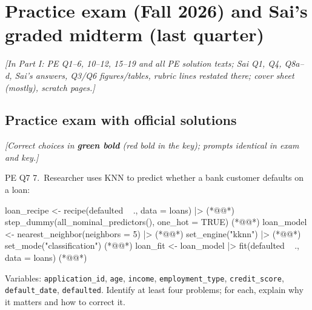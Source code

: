 \section{Practice exam (Fall 2026) and Sai's graded midterm (last quarter)}
{\color{figgray}\itshape [In Part I: PE Q1--6, 10--12, 15--19 and all PE solution texts; Sai Q1, Q4, Q8a--d, Sai's answers, Q3/Q6 figures/tables, rubric lines restated there; cover sheet (mostly), scratch pages.]}

\subsection{Practice exam with official solutions}
{\color{figgray}\itshape [Correct choices in {\color{keyc}\bfseries green bold} (red bold in the key); prompts identical in exam and key.]}

\begin{qbox}{PE Q7}
7.~Researcher uses KNN to predict whether a bank customer defaults on a loan:
\begin{rcode}
loan_recipe <-
  recipe(defaulted ~ ., data = loans) |>                    (*@\ixch{|>}@*)
  step_dummy(all_nominal_predictors(), one_hot = TRUE)      (*@@*)
loan_model <-
  nearest_neighbor(neighbors = 5) |>                        (*@@*)
  set_engine("kknn") |>                                     (*@@*)
  set_mode("classification")                                (*@@*)
loan_fit <-
  loan_model |>
  fit(defaulted ~ ., data = loans)                          (*@@*)
\end{rcode}
Variables: \texttt{application\_id}, \texttt{age}, \texttt{income}, \texttt{employment\_type}, \texttt{credit\_score}, \texttt{default\_date}, \texttt{defaulted}.
Identify at least four problems; for each, explain why it matters and how to correct it.
\end{qbox}

